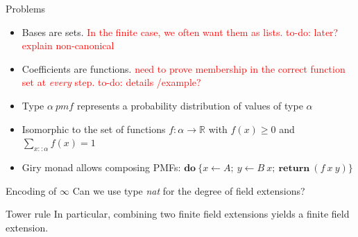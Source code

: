 \documentclass[%
	sans,
	12pt,
]{beamer}
\newcommand{\bad}[1]{\textcolor{red}{#1}}
\begin{document}
\begin{frame}{Problems}
\begin{itemize}
\item Bases are sets.
\bad{In the finite case, we often want them as lists. to-do: later? explain non-canonical}
\item Coefficients are functions.
\bad{need to prove membership in the correct function set at \emph{every} step.
	 to-do: details /example?}
\end{itemize}
\begin{itemize}
\item Type $\alpha\ \textit{pmf}$ represents a probability distribution of values of type $\alpha$\pause
\item Isomorphic to the set of functions $f : \alpha\to\mathbb{R}$ with $f(x) \geq 0$ and $\sum_{x :: \alpha} f(x) = 1$\pause
\item Giry monad allows composing PMFs: $\textbf{do}\ \{x\leftarrow A;\ y \leftarrow B\ x;\ \textbf{return}\ (f\ x\ y)\}$
\end{itemize}
\end{frame}

\begin{frame}{Encoding of $\infty$}
Can we use type \emph{nat} for the degree of field extensions?\pause
{}
\end{frame}

\begin{frame}{Tower rule}
In particular, combining two finite field extensions yields a finite field extension. %
\end{frame}
\end{document}
